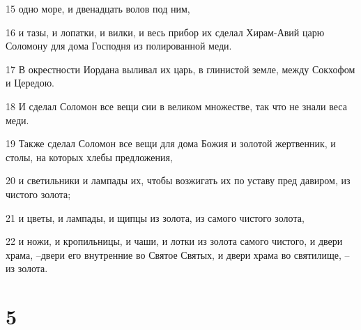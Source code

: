 \par 15 одно море, и двенадцать волов под ним,
\par 16 и тазы, и лопатки, и вилки, и весь прибор их сделал Хирам-Авий царю Соломону для дома Господня из полированной меди.
\par 17 В окрестности Иордана выливал их царь, в глинистой земле, между Сокхофом и Цередою.
\par 18 И сделал Соломон все вещи сии в великом множестве, так что не знали веса меди.
\par 19 Также сделал Соломон все вещи для дома Божия и золотой жертвенник, и столы, на которых хлебы предложения,
\par 20 и светильники и лампады их, чтобы возжигать их по уставу пред давиром, из чистого золота;
\par 21 и цветы, и лампады, и щипцы из золота, из самого чистого золота,
\par 22 и ножи, и кропильницы, и чаши, и лотки из золота самого чистого, и двери храма, --двери его внутренние во Святое Святых, и двери храма во святилище, --из золота.

\chapter{5}

